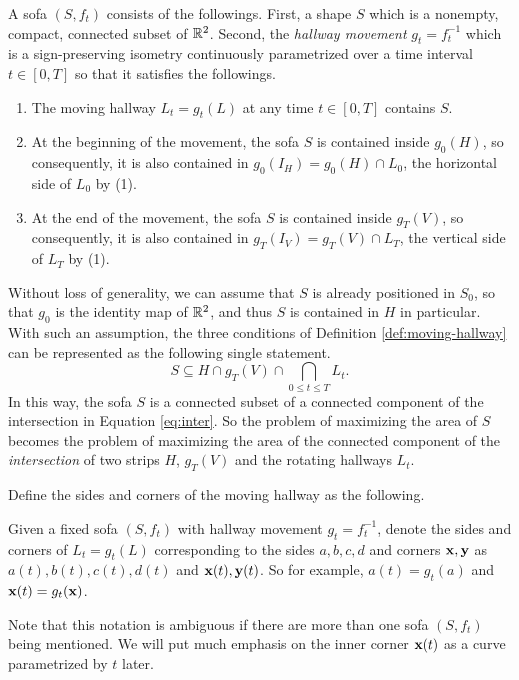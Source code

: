 \begin{definition}
\label{def:moving-hallway}
A sofa $(S, f_t)$ consists of the followings.
First, a shape $S$ which is a nonempty, compact, connected subset of $\mathbb{R}^2$.
Second, the \emph{hallway movement} $g_t = f_t^{-1}$ which is a sign-preserving isometry continuously parametrized over a time interval $t \in [0, T]$ so that it satisfies the followings.

\begin{enumerate}
	\item The moving hallway $L_t = g_t(L)$ at any time $t \in [0, T]$ contains $S$.
	\item At the beginning of the movement, the sofa $S$ is contained inside $g_0(H)$, so consequently, it is also contained in $g_0(I_H) = g_0(H) \cap L_0$, the horizontal side of $L_0$ by (1).
	\item At the end of the movement, the sofa $S$ is contained inside $g_T(V)$, so consequently, it is also contained in $g_T(I_V) = g_T(V) \cap L_T$, the vertical side of $L_T$ by (1). 
\end{enumerate}
\end{definition}

Without loss of generality, we can assume that $S$ is already positioned in $S_0$, so that $g_0$ is the identity map of $\mathbb{R}^2$, and thus $S$ is contained in $H$ in particular. 
With such an assumption, the three conditions of Definition \ref{def:moving-hallway} can be represented as the following single statement.
\begin{equation}
\label{eq:intersection}
S \subseteq H \cap g_T(V) \cap \bigcap_{0 \leq t \leq T} L_t.
\end{equation}
In this way, the sofa $S$ is a connected subset of a connected component of the intersection in Equation \eqref{eq:inter}.
So the problem of maximizing the area of $S$ becomes the problem of maximizing the area of the connected component of the \emph{intersection} of two strips $H$, $g_T(V)$ and the rotating hallways $L_t$.

Define the sides and corners of the moving hallway as the following.
\begin{definition}
Given a fixed sofa $(S, f_t)$ with hallway movement $g_t = f_t^{-1}$, denote the sides and corners of $L_t = g_t(L)$ corresponding to the sides $a, b, c, d$ and corners $\mathbf{x}, \mathbf{y}$ as $a(t), b(t), c(t), d(t)$ and $\mathbf{x}(t), \mathbf{y}(t)$.
So for example, $a(t) = g_t(a)$ and $\mathbf{x}(t) = g_t(\mathbf{x})$.
\end{definition}
Note that this notation is ambiguous if there are more than one sofa $(S, f_t)$ being mentioned. 
We will put much emphasis on the inner corner $\mathbf{x}(t)$ as a curve parametrized by $t$ later.

